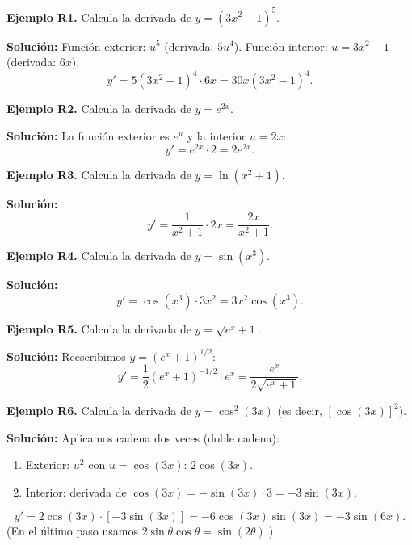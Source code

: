\documentclass[12pt, letterpaper]{article}
\begin{document}
\textbf{Ejemplo R1.} Calcula la derivada de $y = (3x^2 - 1)^5$.

\begin{cuadrosolucion}
  \textbf{Solución:} Función exterior: $u^5$ (derivada: $5u^4$). Función interior: $u = 3x^2 - 1$ (derivada: $6x$).
  $$y' = 5(3x^2 - 1)^4 \cdot 6x = 30x(3x^2 - 1)^4.$$
\end{cuadrosolucion}

\textbf{Ejemplo R2.} Calcula la derivada de $y = e^{2x}$.

\begin{cuadrosolucion}
  \textbf{Solución:} La función exterior es $e^u$ y la interior $u = 2x$:
  $$y' = e^{2x} \cdot 2 = 2e^{2x}.$$
\end{cuadrosolucion}

\textbf{Ejemplo R3.} Calcula la derivada de $y = \ln(x^2 + 1)$.

\begin{cuadrosolucion}
  \textbf{Solución:}
  $$y' = \frac{1}{x^2 + 1} \cdot 2x = \frac{2x}{x^2 + 1}.$$
\end{cuadrosolucion}

\textbf{Ejemplo R4.} Calcula la derivada de $y = \sin(x^3)$.

\begin{cuadrosolucion}
  \textbf{Solución:}
  $$y' = \cos(x^3) \cdot 3x^2 = 3x^2 \cos(x^3).$$
\end{cuadrosolucion}

\textbf{Ejemplo R5.} Calcula la derivada de $y = \sqrt{e^x + 1}$.

\begin{cuadrosolucion}
  \textbf{Solución:} Reescribimos $y = (e^x + 1)^{1/2}$:
  $$y' = \frac{1}{2}(e^x + 1)^{-1/2} \cdot e^x = \frac{e^x}{2\sqrt{e^x + 1}}.$$
\end{cuadrosolucion}

\newpage

\textbf{Ejemplo R6.} Calcula la derivada de $y = \cos^2(3x)$ (es decir, $[\cos(3x)]^2$).

\begin{cuadrosolucion}
  \textbf{Solución:} Aplicamos cadena dos veces (doble cadena):
  \begin{enumerate}
    \item Exterior: $u^2$ con $u = \cos(3x)$: $2\cos(3x)$.
    \item Interior: derivada de $\cos(3x) = -\sin(3x) \cdot 3 = -3\sin(3x)$.
  \end{enumerate}
  $$y' = 2\cos(3x) \cdot [-3\sin(3x)] = -6\cos(3x)\sin(3x) = -3\sin(6x).$$
  (En el último paso usamos $2\sin\theta\cos\theta = \sin(2\theta)$.)
\end{cuadrosolucion}
\end{document}
